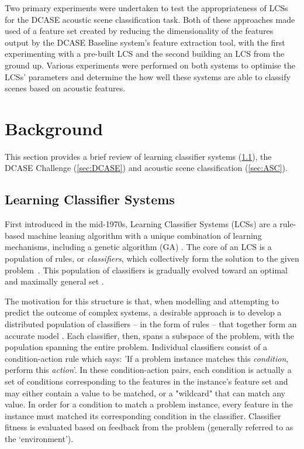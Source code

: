 \documentclass[11pt]{article}
\begin{document}
Two primary experiments were undertaken to test the appropriateness of LCSs for the DCASE acoustic scene classification task. Both of these approaches made used of a feature set created by reducing the dimensionality of the features output by the DCASE Baseline system's feature extraction tool, with the first experimenting with a pre-built LCS and the second building an LCS from the ground up. Various experiments were performed on both systems to optimise the LCSs' parameters and determine the how well these systems are able to classify scenes based on acoustic features.




\section{Background}

This section provides a brief review of learning classifier systems (\ref{sec:LCS}), the DCASE Challenge (\ref{sec:DCASE}) and acoustic scene classification (\ref{sec:ASC}).



\subsection{Learning Classifier Systems}
\label{sec:LCS}

First introduced in the mid-1970s, Learning Classifier Systems (LCSs) are a rule-based machine leaning algorithm with a unique combination of learning mechanisms, including a genetic algorithm (GA) \cite{Butz2015}. The core of an LCS is a population of rules, or \textit{classifiers}, which collectively form the solution to the given problem~\cite{Urbanowicz2009}. This population of classifiers is gradually evolved toward an optimal and maximally general set \cite{Urbanowicz2009}.

The motivation for this structure is that, when modelling and attempting to predict the outcome of complex systems, a desirable approach is to develop a distributed population of classifiers -- in the form of rules -- that together form an accurate model \cite[p.~2]{Urbanowicz2009}. Each classifier, then, spans a subspace of the problem, with the population spanning the entire problem. Individual classifiers consist of a condition-action rule which says: 'If a problem instance matches this \textit{condition}, perform this \textit{action}'. In these condition-action pairs, each condition is actually a set of conditions corresponding to the features in the instance's feature set and may either contain a value to be matched, or a "wildcard" that can match any value. In order for a condition to match a problem instance, every feature in the instance must matched its corresponding condition in the classifier. Classifier fitness is evaluated based on feedback from the problem (generally referred to as the `environment').
\end{document}
